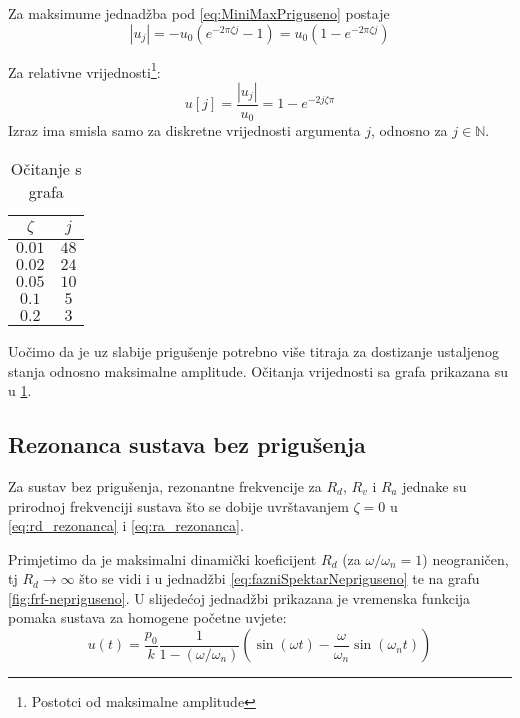 Za maksimume jednadžba pod \eqref{eq:MiniMaxPriguseno} postaje
\begin{equation}
    |u_j| = -u_0(e^{-2\pi\zeta j} -1) = u_0(1-e^{-2\pi\zeta j})
\end{equation}

Za relativne vrijednosti\footnote{Postotci od maksimalne amplitude}:
\begin{equation}
    u[j] = \frac{|u_j|}{u_0}=1-e^{-2j\zeta\pi}
\end{equation}
Izraz ima smisla samo za diskretne vrijednosti argumenta $j$, odnosno za $j \in
\mathbb{N}$.

\par
\begin{table}[H]
    \begin{tabular}{c | c}
       \hline
        $\zeta$ & $j$\\
        \hline
        $0.01$ & $48$\\
        \hline
        $0.02$ & $24$\\
        \hline
        $0.05$ & $10$\\
        \hline
        $0.1$ & $5$\\
        \hline
        $0.2$ & $3$\\
        \hline
    \end{tabular}
    \caption{Očitanje s grafa}
    \label{table:prirast-rezonanca-priguseno}
\end{table}

Uočimo da je uz slabije prigušenje potrebno više titraja za dostizanje ustaljenog
stanja odnosno maksimalne amplitude. Očitanja vrijednosti sa grafa prikazana su u
\ref{table:prirast-rezonanca-priguseno}.

\subsection{Rezonanca sustava bez prigušenja}
Za sustav bez prigušenja, rezonantne frekvencije za $R_d$, $R_v$ i $R_a$ jednake su
prirodnoj frekvenciji sustava što se dobije uvrštavanjem $\zeta = 0$ u \eqref{eq:rd_rezonanca} i 
\eqref{eq:ra_rezonanca}. 
\par

Primjetimo da je maksimalni dinamički koeficijent $R_d$ (za $\omega/\omega_n = 1$) 
neograničen, tj $R_d\to \infty$ što se vidi i u jednadžbi \eqref{eq:fazniSpektarNepriguseno} 
te na grafu \ref{fig:frf-nepriguseno}. U slijedećoj jednadžbi prikazana je vremenska 
funkcija pomaka sustava za homogene početne uvjete:
\begin{equation}
    u(t)=\frac{p_0}{k}\frac{1}{1-(\omega/\omega_n)}
            \left(\sin(\omega t) - \frac{\omega}{\omega_n}\sin(\omega_n t)\right)
\end{equation}

